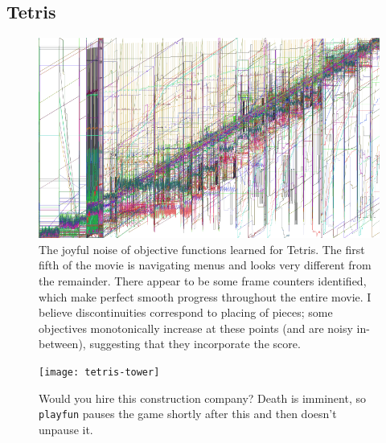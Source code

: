 \documentclass[twocolumn]{article}
\begin{document}
\subsection{Tetris}

\begin{figure}[ht]
\begin{center}
\includegraphics[width=0.95 \linewidth]{tetris}
\end{center}\vspace{-0.1in}
\caption{The joyful noise of objective functions learned for Tetris.
  The first fifth of the movie is navigating menus and looks very
  different from the remainder. There appear to be some frame counters
  identified, which make perfect smooth progress throughout the entire
  movie. I believe discontinuities correspond to placing of pieces;
  some objectives monotonically increase at these points (and are noisy
  in-between), suggesting that they incorporate the score.
}
\label{fig:tetris-objectives}
\end{figure}

\begin{figure}[ht]
\begin{center}
\texttt{[image: tetris-tower]}
\end{center}\vspace{-0.1in}
\caption{Would you hire this construction company? Death is imminent,
so {\tt playfun} pauses the game shortly after this and then doesn't
unpause it.}
\label{fig:tetris-tower}
\end{figure}
\end{document}

